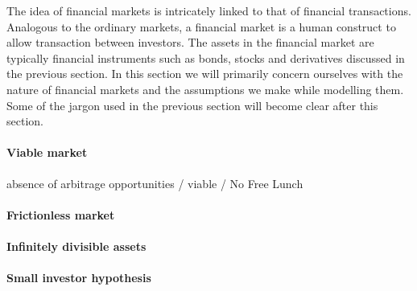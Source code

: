 The idea of financial markets is intricately linked to that of financial transactions. Analogous to the ordinary markets, a financial market is a human construct to allow transaction between investors. The assets in the financial market are typically financial instruments such as bonds, stocks and derivatives discussed in the previous section. In this section we will primarily concern ourselves with the nature of financial markets and the assumptions we make while modelling them. Some of the jargon used in the previous section will become clear after this section.


\paragraph{Viable market}
absence of arbitrage opportunities / viable / No Free Lunch


\paragraph{Frictionless market}


\paragraph{Infinitely divisible assets}


\paragraph{Small investor hypothesis}



